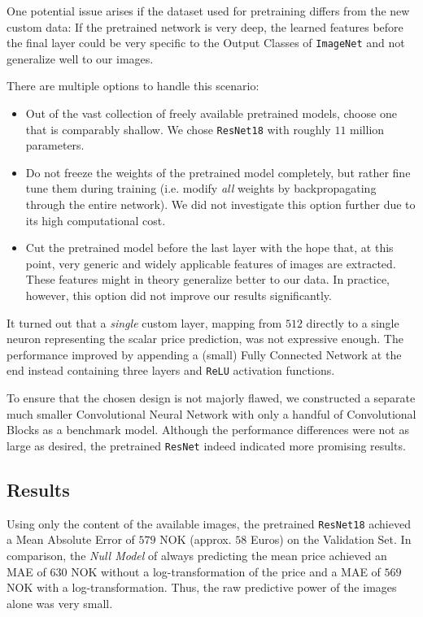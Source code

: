 \documentclass[12pt, letterpaper]{article}
\begin{document}
One potential issue arises if the dataset used for pretraining differs from the new custom data:
If the pretrained network is very deep, the learned features before the final layer could be very specific to the Output Classes of \texttt{ImageNet} and not generalize well to our images.

There are multiple options to handle this scenario:
\begin{itemize}
    \item Out of the vast collection of freely available pretrained models, choose one that is comparably shallow.
          We chose \texttt{ResNet18} with roughly $11$ million parameters.
    \item Do not freeze the weights of the pretrained model completely, but rather fine tune them during training (i.e. modify \emph{all} weights by backpropagating through the entire network).
          We did not investigate this option further due to its high computational cost.
    \item Cut the pretrained model before the last layer with the hope that, at this point, very generic and widely applicable features of images are extracted.
          These features might in theory generalize better to our data.
          In practice, however, this option did not improve our results significantly.
\end{itemize}

It turned out that a \emph{single} custom layer, mapping from $512$ directly to a single neuron representing the scalar price prediction, was not expressive enough.
The performance improved by appending a (small) Fully Connected Network at the end instead containing three layers and \texttt{ReLU} activation functions.

To ensure that the chosen design is not majorly flawed, we constructed a separate much smaller Convolutional Neural Network with only a handful of Convolutional Blocks as a benchmark model.
Although the performance differences were not as large as desired, the pretrained \texttt{ResNet} indeed indicated more promising results.


\subsection{Results}

Using only the content of the available images, the pretrained \texttt{ResNet18} achieved a Mean Absolute Error of $579$ NOK (approx. $58$ Euros) on the Validation Set.
In comparison, the \emph{Null Model} of always predicting the mean price achieved an MAE of $630$ NOK without a log-transformation of the price and a MAE of $569$ NOK with a log-transformation.
Thus, the raw predictive power of the images alone was very small.
\end{document}
